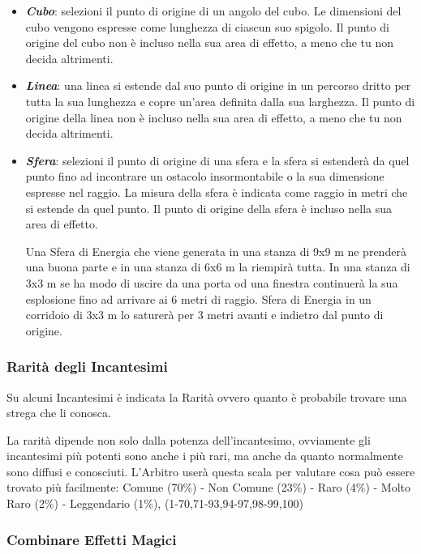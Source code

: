 \documentclass[12pt,a4paper,twoside,openany]{book}
\begin{document}
\begin{multicols}{2}
\begin{itemize}
\item
\textit{\textbf{Cubo}}: selezioni il punto di origine di un angolo del cubo. Le dimensioni del cubo vengono espresse come lunghezza di ciascun suo spigolo. Il punto di origine del cubo non è incluso nella sua area di effetto, a meno che tu non decida altrimenti.
	
\item
\textit{\textbf{Linea}}: una linea si estende dal suo punto di origine in un percorso dritto per tutta la sua lunghezza e copre un'area definita dalla sua larghezza. Il punto di origine della linea non è incluso nella sua area di effetto, a meno che tu non decida altrimenti.
	
\item
\textit{\textbf{Sfera}}: selezioni il punto di origine di una sfera e la sfera si estenderà da quel punto fino ad incontrare un ostacolo insormontabile o la sua dimensione espresse nel raggio. La misura della sfera è indicata come raggio in metri che si estende da quel punto. Il punto di origine della sfera è incluso nella sua area di effetto.
	
Una Sfera di Energia che viene generata in una stanza di 9x9 m ne prenderà una buona parte e in una stanza di 6x6 m la riempirà tutta. In una stanza di 3x3 m se ha modo di uscire da una porta od una finestra continuerà la sua esplosione fino ad arrivare ai 6 metri di raggio. Sfera di Energia in un corridoio di 3x3 m lo saturerà per 3 metri avanti e indietro dal punto di origine.
	
\end{itemize}

\subsubsection{Rarità degli Incantesimi}\label{magieraritaincantesimi}

Su alcuni Incantesimi è indicata la Rarità ovvero quanto è probabile trovare una strega che li conosca.

La rarità dipende non solo dalla potenza dell'incantesimo, ovviamente gli incantesimi più potenti sono anche i più rari, ma anche da quanto normalmente sono diffusi e conosciuti. L'Arbitro userà questa scala per valutare cosa può essere trovato più facilmente: Comune (70\%) - Non Comune (23\%) - Raro (4\%) - Molto Raro (2\%) - Leggendario (1\%), (1-70,71-93,94-97,98-99,100)

\subsubsection{Combinare Effetti Magici}\label{magiecombinareeffettimagici}


\end{multicols}
\end{document}

